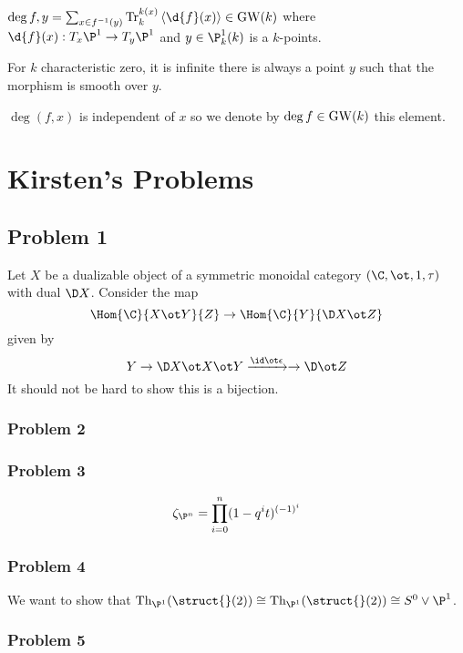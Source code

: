 \documentclass{article}
\newcommand{\Th}{\mathrm{Th}}
\begin{document}
\begin{defn}
$\deg{f, y} = \sum_{x \in f^{-1}(y)} \mathrm{Tr}^{k(x)}_k \left< \d{f}(x) \right> \in \GW(k)$ 
where $\d{f}(x) : T_x \P^1 \to T_y \P^1$ and $y \in \P^1_k(k)$ is a $k$-points.
\end{defn}

\begin{rmk}
For $k$ characteristic zero, it is infinite there is always a point $y$ such that the morphism is smooth over $y$. 
\end{rmk}

\begin{theorem}
$\deg{(f,x)}$ is independent of $x$ so we denote by $\deg{f} \in \mathrm{GW}(k)$ this element. 
\end{theorem}

\section{Kirsten's Problems}

\subsection{Problem 1}

Let $X$ be a dualizable object of a symmetric monoidal category $(\C, \ot, 1, \tau)$ with dual $\D X$. Consider the map
\[ \Hom{\C}{X \ot Y}{Z} \to \Hom{\C}{Y}{\D X \ot Z} \]
given by 
\[ Y \to \D X \ot X \ot Y \xrightarrow{\id \ot \epsilon} \to \D \ot Z \]
It should not be hard to show this is a bijection.

\subsubsection{Problem 2}


\subsubsection{Problem 3}

\[ \zeta_{\P^n} = \prod_{i = 0}^n (1 - q^i t)^{(-1)^i} \]

\subsubsection{Problem 4}

We want to show that $\Th_{\P^1}(\struct{}(2)) \cong \Th_{\P^1}(\struct{}(2)) \cong S^0 \vee \P^1$. 

\subsubsection{Problem 5}
\end{document}
